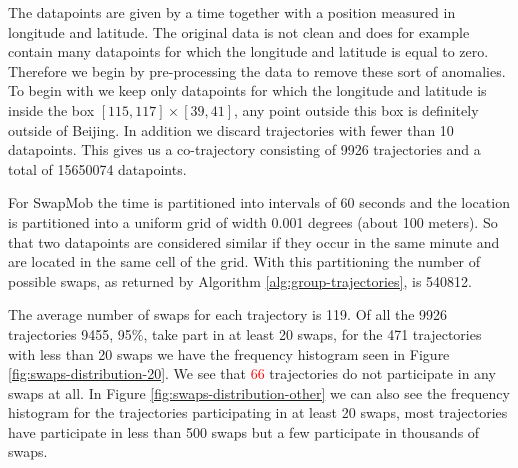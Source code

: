 \documentclass[12pt]{article}
\newcommand{\todo}[1]{\textcolor{red}{#1}}
\theoremstyle{definition}
\begin{document}
The datapoints are given by a time together with a position measured
in longitude and latitude. The original data is not clean and does for
example contain many datapoints for which the longitude and latitude
is equal to zero. Therefore we begin by pre-processing the data to
remove these sort of anomalies. To begin with we keep only
datapoints for which the longitude and latitude is inside the box
\([115, 117] \times [39, 41]\), any point outside this box is
definitely outside of Beijing. In addition we discard trajectories
with fewer than 10 datapoints. This gives us a co-trajectory
consisting of 9926 trajectories and a total of 15650074 datapoints.

For SwapMob the time is partitioned into intervals of 60 seconds and
the location is partitioned into a uniform grid of width 0.001 degrees
(about 100 meters). So that two datapoints are considered similar if
they occur in the same minute and are located in the same cell of the
grid. With this partitioning the number of possible swaps, as returned
by Algorithm \ref{alg:group-trajectories}, is 540812.

The average number of swaps for each trajectory is 119. Of all the
9926 trajectories 9455, 95\%, take part in at least 20 swaps, for the
471 trajectories with less than 20 swaps we have the frequency
histogram seen in Figure \ref{fig:swaps-distribution-20}. We see that
\todo{66} trajectories do not participate in any swaps at all. In
Figure \ref{fig:swaps-distribution-other} we can also see the
frequency histogram for the trajectories participating in at least 20
swaps, most trajectories have participate in less than 500 swaps but a
few participate in thousands of swaps.
\end{document}
